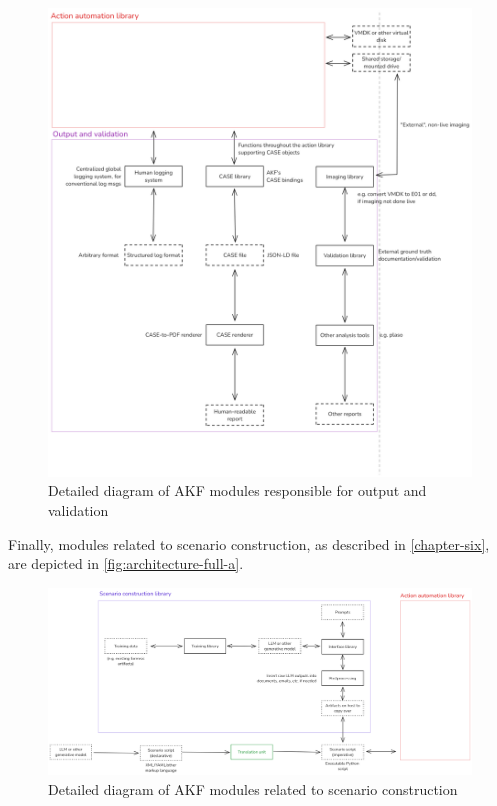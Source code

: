 \documentclass[letterpaper,12pt]{report}
\begin{document}
\begin{figure}[h]
\centering
\includegraphics[width=1\linewidth]{architecture-full-c.png}
\caption{Detailed diagram of AKF modules responsible for output and
validation}\label{fig:architecture-full-c}
\end{figure}

Finally, modules related to scenario construction, as described in
\autoref{chapter-six}, are depicted in
\autoref{fig:architecture-full-a}.

\begin{figure}[h]
\centering
\includegraphics[width=1\linewidth]{architecture-full-a.png}
\caption{Detailed diagram of AKF modules related to scenario
construction}\label{fig:architecture-full-a}
\end{figure}
\end{document}
